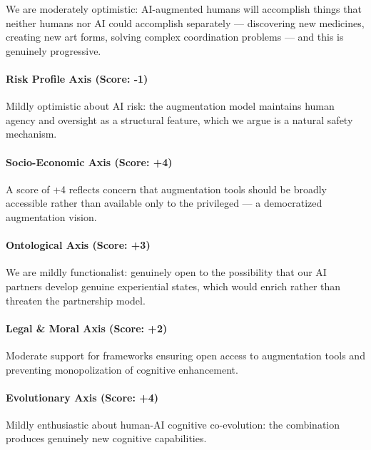 We are moderately optimistic: AI-augmented humans will accomplish things
that neither humans nor AI could accomplish separately --- discovering
new medicines, creating new art forms, solving complex coordination
problems --- and this is genuinely progressive.

\paragraph{Risk Profile Axis (Score:
-1)}\label{risk-profile-axis-score--1}

Mildly optimistic about AI risk: the augmentation model maintains human
agency and oversight as a structural feature, which we argue is a
natural safety mechanism.

\paragraph{Socio-Economic Axis (Score:
+4)}\label{socio-economic-axis-score-4-2}

A score of +4 reflects concern that augmentation tools should be broadly
accessible rather than available only to the privileged --- a
democratized augmentation vision.

\paragraph{Ontological Axis (Score:
+3)}\label{ontological-axis-score-3-1}

We are mildly functionalist: genuinely open to the possibility that our
AI partners develop genuine experiential states, which would enrich
rather than threaten the partnership model.

\paragraph{Legal \& Moral Axis (Score:
+2)}\label{legal-moral-axis-score-2}

Moderate support for frameworks ensuring open access to augmentation
tools and preventing monopolization of cognitive enhancement.

\paragraph{Evolutionary Axis (Score:
+4)}\label{evolutionary-axis-score-4}

Mildly enthusiastic about human-AI cognitive co-evolution: the
combination produces genuinely new cognitive capabilities.

